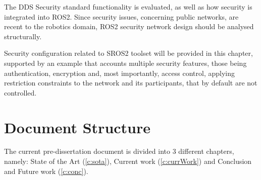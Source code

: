 The DDS Security standard functionality is evaluated, as well as how security is integrated into ROS2. Since security issues, concerning public networks, are recent to the robotics domain, ROS2 security network design should be analysed structurally.

Security configuration related to SROS2 toolset will be provided in this chapter, supported by an example that accounts multiple security features, those being authentication, encryption and, most importantly, access control, applying restriction constraints to the network and its participants, that by default are not controlled.


\section{Document Structure}
The current pre-dissertation document is divided into 3 different chapters, namely: State of the Art (\ref{c:sota}), Current work (\ref{c:currWork}) and Conclusion and Future work (\ref{c:conc}).